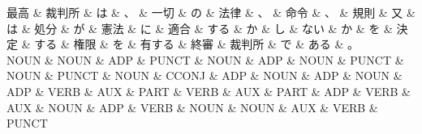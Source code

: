 \documentclass[tikz,border=5pt]{standalone}
\begin{document}
\small
\begin{dependency}[edge unit distance=8.6pt]
    \begin{deptext}[column sep=0.5em]
        最高 \& 裁判所 \& は \& 、 \& 一切 \& の \& 法律 \& 、 \& 命令 \& 、 \& 規則 \& 又 \& は \& 処分 \& が \& 憲法 \& に \& 適合 \& する \& か \& し \& ない \& か \& を \& 決定 \& する \& 権限 \& を \& 有する \& 終審 \& 裁判所 \& で \& ある \& 。\\
        NOUN \& NOUN \& ADP \& PUNCT \& NOUN \& ADP \& NOUN \& PUNCT \& NOUN \& PUNCT \& NOUN \& CCONJ \& ADP \& NOUN \& ADP \& NOUN \& ADP \& VERB \& AUX \& PART \& VERB \& AUX \& PART \& ADP \& VERB \& AUX \& NOUN \& ADP \& VERB \& NOUN \& NOUN \& AUX \& VERB \& PUNCT\\
    \end{deptext}
\end{dependency}
\end{document}
